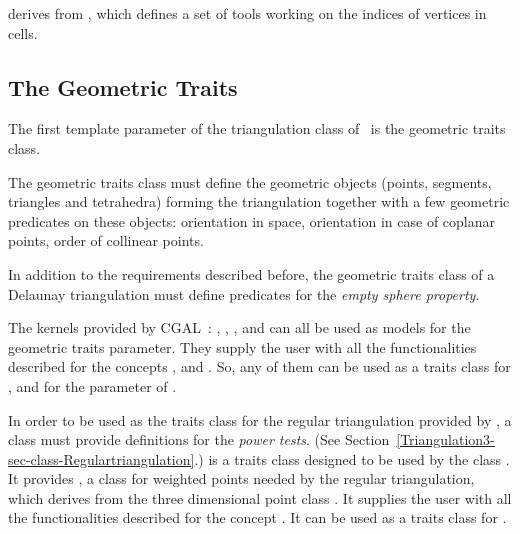  derives from
, which defines a set of tools
working on the indices of vertices in cells. 

\subsection{The Geometric Traits}
\label{Triangulation3-sec-Traits}

The first template parameter of the triangulation class
of \cgal\ is the geometric traits class.

The geometric traits class must define the geometric
objects (points, segments, triangles and tetrahedra) forming the
triangulation together with a few geometric predicates on these objects:
orientation in space, orientation in case of coplanar points, order of
collinear points.

In addition to the requirements described before, the geometric traits
class of a Delaunay triangulation must define predicates for the
\textit{empty sphere property}.

The kernels provided by CGAL~: , ,
,  and
 can all be used as models for the geometric traits
parameter.
They supply the user with all the functionalities described for the concepts
,
 and
.
So, any of them can be used as a traits class for
,
and for the parameter  of .

In order to be used as the traits class for the regular triangulation provided
by \cgal, a class must provide definitions for the \textit{power tests}.
(See Section~\ref{Triangulation3-sec-class-Regulartriangulation}.)
 is a traits class 
 designed to be used by the class
. It provides
, a class for weighted points
needed by the regular triangulation, which derives from the three dimensional
point class .
It supplies the user with all the functionalities 
described for the concept . 
It can be used as a traits class for
.

